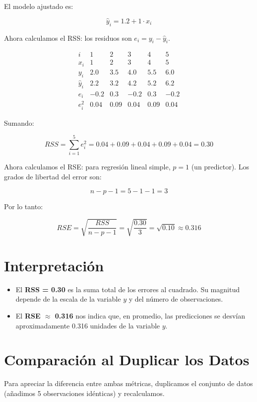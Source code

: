 \documentclass[12pt, a4paper]{article}
\begin{document}
El modelo ajustado es:

\[
\hat{y}_i = 1.2 + 1 \cdot x_i
\]

Ahora calculamos el RSS: los residuos son $e_i = y_i - \hat{y}_i$.

\[
\begin{array}{c|ccccc}
i & 1 & 2 & 3 & 4 & 5 \\
\hline
x_i & 1 & 2 & 3 & 4 & 5 \\
y_i & 2.0 & 3.5 & 4.0 & 5.5 & 6.0 \\
\hat{y}_i & 2.2 & 3.2 & 4.2 & 5.2 & 6.2 \\
e_i & -0.2 & 0.3 & -0.2 & 0.3 & -0.2 \\
e_i^2 & 0.04 & 0.09 & 0.04 & 0.09 & 0.04
\end{array}
\]

Sumando:

\[
RSS = \sum_{i=1}^{5} e_i^2 = 0.04 + 0.09 + 0.04 + 0.09 + 0.04 = 0.30
\]

Ahora calculamos el RSE: para regresión lineal simple, $p = 1$ (un predictor). Los grados de libertad del error son:

\[
n - p - 1 = 5 - 1 - 1 = 3
\]

Por lo tanto:

\[
RSE = \sqrt{\frac{RSS}{n - p - 1}} = \sqrt{\frac{0.30}{3}} = \sqrt{0.10} \approx 0.316
\]

\section{Interpretación}

\begin{itemize}
    \item El \textbf{RSS = 0.30} es la suma total de los errores al cuadrado. Su magnitud depende de la escala de la variable $y$ y del número de observaciones.
    \item El \textbf{RSE $\approx$ 0.316} nos indica que, en promedio, las predicciones se desvían aproximadamente 0.316 unidades de la variable $y$.
\end{itemize}

\section{Comparación al Duplicar los Datos}

Para apreciar la diferencia entre ambas métricas, duplicamos el conjunto de datos (añadimos 5 observaciones idénticas) y recalculamos.
\end{document}
